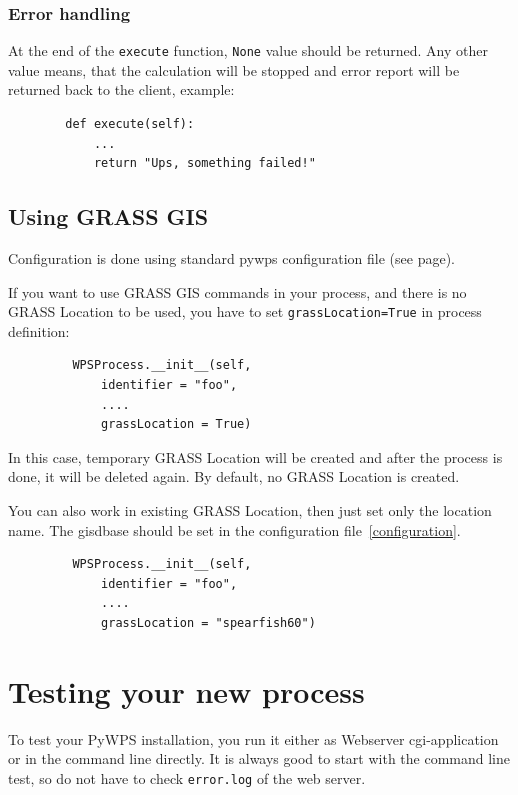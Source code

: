 \documentclass[a4paper,11pt]{report}
\begin{document}
\subsection{Error handling}
    
At the end of the \texttt{execute} function, \texttt{None} value should be returned. Any other 
value means, that the calculation will be stopped and error report will be
returned back to the client, example:

\begin{verbatim}
        def execute(self):
            ...
            return "Ups, something failed!"
\end{verbatim}
    

\section{Using GRASS GIS}

Configuration is done using standard pywps configuration file (see
page\pageref{configuration}).


If you want to use GRASS GIS commands in your process, and there is no
GRASS Location to be used, you have to set \texttt{grassLocation=True} in
process definition:

\begin{verbatim}
         WPSProcess.__init__(self,
             identifier = "foo",
             ....
             grassLocation = True)
\end{verbatim}

In this case, temporary GRASS Location will be created and after the
process is done, it will be deleted again. By default, no GRASS Location is
created.

You can also work in existing GRASS Location, then just set only the location
name. The gisdbase should be set in the configuration
file~\ref{configuration}.
\begin{verbatim}
         WPSProcess.__init__(self,
             identifier = "foo",
             ....
             grassLocation = "spearfish60")
\end{verbatim}

\chapter{Testing your new process}

To test your PyWPS installation, you run it either as Webserver
cgi-application or in the command line directly. It is always good to start
with the command line test, so do not have to check \texttt{error.log} of
the web server.
\end{document}
